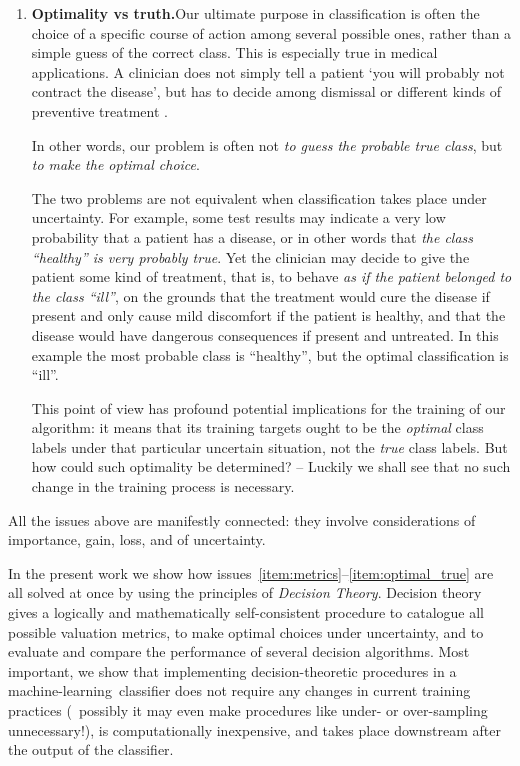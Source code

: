 \documentclass[\ifafour a4paper,12pt,\else a5paper,10pt,\fi%
onecolumn,oneside,article,%
british%
]{memoir}
\theoremstyle{remark}
\theoremstyle{innote}
\renewcommand*{\|}[1][]{\nonscript\:#1\vert\nonscript\:\mathopen{}}
\newcommand*{\puzzle}{{\fontencoding{U}\fontfamily{fontawesometwo}\selectfont\symbol{225}}}
\newcommand{\mynote}[1]{ {\color{notecolour}#1}}
\newcommand*{\ml}{machine-learning}
\begin{document}
\begin{enumerate}[label=\textbf{\textsf{i\arabic*}},ref=\textbf{\textsf{i\arabic*}},itemsep=\parsep]
  
\item\label{item:optimal_true}\textsf{\textbf{Optimality vs truth.}}\enspace  Our ultimate purpose in classification is often the choice of a specific course of action among several possible ones, rather than a simple guess of the correct class. This is especially true in medical applications. A clinician does not simply tell a patient \enquote*{you will probably not contract the disease}, but has to decide among dismissal or different kinds of preventive treatment \autocites{soxetal1988_r2013,huninketal2001_r2014}.

  In other words, our problem is often not \emph{to guess the probable true class}, but \emph{to make the optimal choice}.

  The two problems are not equivalent when classification takes place under uncertainty. For example, some test results may indicate a very low probability that a patient has a disease, or in other words that \emph{the class \enquote{healthy} is very probably true}. Yet the clinician may decide to give the patient some kind of treatment, that is, to behave \emph{as if the patient belonged to the class \enquote{ill}}, on the grounds that the treatment would cure the disease if present and only cause mild discomfort if the patient is healthy, and that the disease would have dangerous consequences if present and untreated. In this example the most probable class is \enquote{healthy}, but the optimal classification is \enquote{ill}.

This point of view has profound potential implications for the training of our algorithm: it means that its training targets ought to be the \emph{optimal} class labels under that particular uncertain situation, not the \emph{true} class labels. But how could such optimality be determined? -- Luckily we shall see that no such change in the training process is necessary.

\end{enumerate}


\medskip

All the issues above are manifestly connected: they involve considerations of importance, gain, loss, and of uncertainty.

In the present work we show how issues~\ref{item:metrics}--\ref{item:optimal_true} are all solved at once by using the principles of \emph{Decision Theory}. Decision theory gives a logically and mathematically self-consistent procedure to catalogue all possible valuation metrics, to make optimal choices under uncertainty, and to evaluate and compare the performance of several decision algorithms. Most important, we show that implementing decision-theoretic procedures in a \ml\ classifier does not require any changes in current training practices \mynote{(\puzzle\ possibly it may even make procedures like under- or over-sampling unnecessary!)}, is computationally inexpensive, and takes place downstream after the output of the classifier.
\end{document}
